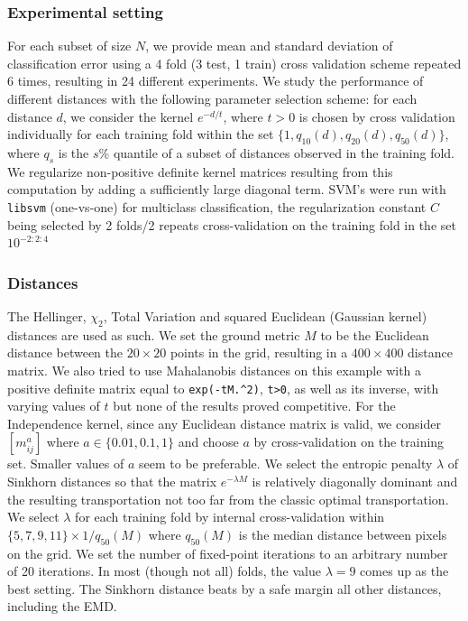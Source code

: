 \documentclass{amsart} %
\begin{document}
\subsubsection{Experimental setting}  For each subset of size $N$, we provide mean and standard deviation of classification error using a 4 fold (3 test, 1 train) cross validation scheme repeated 6 times, resulting in 24 different experiments. We study the performance of different distances with the following parameter selection scheme: for each distance $d$, we consider the kernel $e^{-d/t}$, where $t>0$ is chosen by cross validation individually for each training fold within the set $\{1,q_{10}(d),q_{20}(d),q_{50}(d)\}$, where $q_s$ is the $s\%$ quantile of a subset of distances observed in the training fold. 
We regularize non-positive definite kernel matrices resulting from this computation by adding a sufficiently large diagonal term. SVM's were run with \texttt{libsvm} (one-vs-one) for multiclass classification, the regularization constant $C$ being selected by 2 folds/2 repeats cross-validation on the training fold in the set $10^{-2:2:4}$

\subsubsection{Distances} The Hellinger, $\chi_2$, Total Variation and squared Euclidean (Gaussian kernel) distances are used as such. We set the ground metric $M$ to be the Euclidean distance between the $20\times 20$ points in the grid, resulting in a $400\times 400$ distance matrix. We also tried to use Mahalanobis distances on this example with a positive definite matrix equal to \texttt{exp(-tM.\^{}2)}, \texttt{t>0},  as well as its inverse, with varying values of $t$ but none of the results proved competitive. For the Independence kernel, since any Euclidean distance matrix is valid, we consider $[m_{ij}^a]$ where $a\in\{0.01,0.1,1\}$ and choose $a$ by cross-validation on the training set. Smaller values of $a$ seem to be preferable. We select the entropic penalty $\lambda$ of Sinkhorn distances so that the matrix $e^{-\lambda M}$ is relatively diagonally dominant and the resulting transportation not too far from the classic optimal transportation. We select $\lambda$ for each training fold by internal cross-validation within $\{5,7,9,11\}\times 1/q_{50}(M)$ where $q_{50}(M)$ is the median distance between pixels on the grid. We set the number of fixed-point iterations to an arbitrary number of 20 iterations. In most (though not all) folds, the value $\lambda=9$ comes up as the best setting. The Sinkhorn distance beats by a safe margin all other distances, including the EMD.
\end{document}
